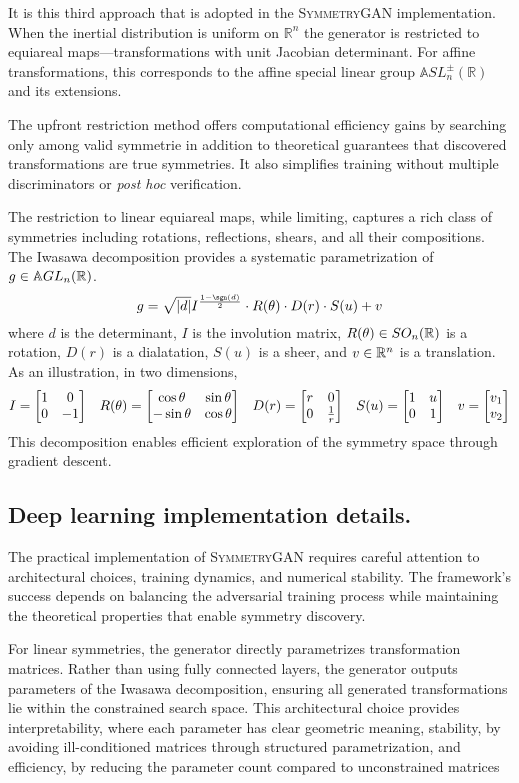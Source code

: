     It is this third approach that is adopted in the \textsc{SymmetryGAN} implementation.
    When the inertial distribution is uniform on \(\mathbb{R}^n\) the generator is restricted to equiareal maps---transformations with unit Jacobian determinant.
    For affine transformations, this corresponds to the affine special linear group \(\mathbb{A}SL^\pm_n(\mathbb{R})\) and its extensions.

    The upfront restriction method offers computational efficiency gains by searching only among valid symmetrie in addition to theoretical guarantees that discovered transformations are true symmetries.
    It also simplifies training without multiple discriminators or \textit{post hoc} verification.

    The restriction to linear equiareal maps, while limiting, captures a rich class of symmetries including rotations, reflections, shears, and all their compositions.
    The Iwasawa decomposition\kd{} provides a systematic parametrization of \(g\in\mathbb{A}GL_n(\mathbb{R})\).
    \[
        g = \sqrt{|d|} I^{\frac{1-\sgn(d)}{2}} \cdot R(\theta) \cdot D(r) \cdot S(u) + v
    \]
    where \(d\) is the determinant, \(I\) is the involution matrix, \(R(\theta)\in SO_n(\mathbb{R})\) is a rotation, \(D(r)\) is a dialatation, \(S(u)\) is a sheer, and \(v\in\mathbb{R}^n\) is a translation.
    As an illustration, in two dimensions,
    \[
        I = \mqty[1&0\\0&-1] \quad R(\theta) = \mqty[\cos\theta&\sin\theta\\-\sin\theta&\cos\theta] \quad D(r) = \mqty[r&0\\0&\frac1r] \quad S(u) = \mqty[1 & u\\0&1]\quad v = \mqty[v_1\\v_2]
    \]
    This decomposition enables efficient exploration of the symmetry space through gradient descent.

    \subsection{Deep learning implementation details.}

    The practical implementation of \textsc{SymmetryGAN} requires careful attention to architectural choices, training dynamics, and numerical stability.
    The framework's success depends on balancing the adversarial training process while maintaining the theoretical properties that enable symmetry discovery.
    
    For linear symmetries, the generator directly parametrizes transformation matrices.
    Rather than using fully connected layers, the generator outputs parameters of the Iwasawa decomposition, ensuring all generated transformations lie within the constrained search space.
    This architectural choice provides interpretability, where each parameter has clear geometric meaning, stability, by avoiding ill-conditioned matrices through structured parametrization, and efficiency, by reducing the parameter count compared to unconstrained matrices

